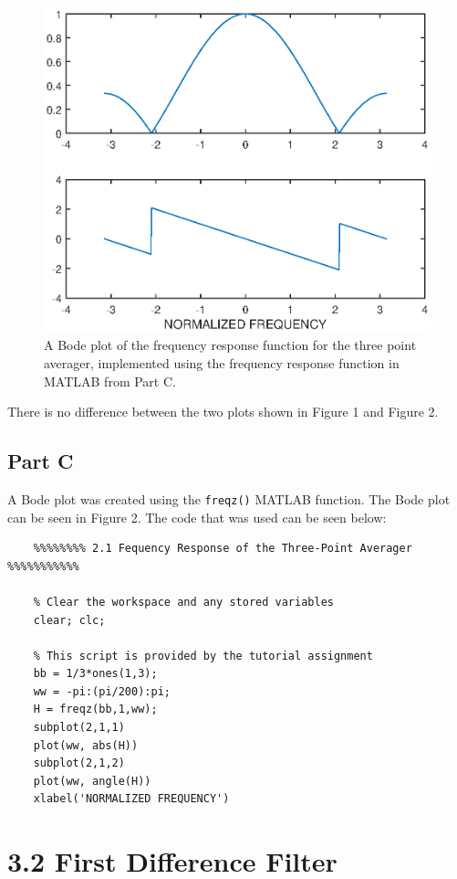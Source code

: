 \documentclass{article}
\begin{document}
\begin{figure}[h]
		\centering
		\includegraphics[scale=0.4]{fig2}
		\caption{A Bode plot of the frequency response function for the three point averager, implemented using the frequency response function in MATLAB from Part C.}
\end{figure}


There is no difference between the two plots shown in Figure 1 and Figure 2.

\subsection{Part C}

A Bode plot was created using the \verb|freqz()| MATLAB function. The Bode plot can be seen in Figure 2. The code that was used can be seen below:

\begin{lstlisting}
	%%%%%%%% 2.1 Fequency Response of the Three-Point Averager %%%%%%%%%%%
	
	% Clear the workspace and any stored variables
	clear; clc;
	
	% This script is provided by the tutorial assignment
	bb = 1/3*ones(1,3);
	ww = -pi:(pi/200):pi;
	H = freqz(bb,1,ww);
	subplot(2,1,1)
	plot(ww, abs(H))
	subplot(2,1,2)
	plot(ww, angle(H))
	xlabel('NORMALIZED FREQUENCY')
\end{lstlisting}

\section{3.2 First Difference Filter}
\end{document}
